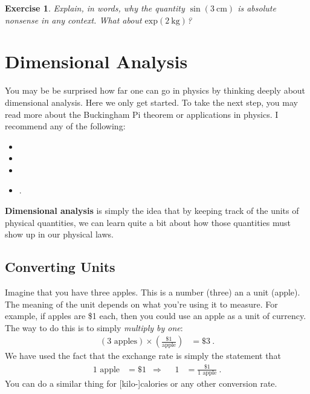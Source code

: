 \documentclass[
  11pt,
	colorful,
	raggedright,
]{tufte-style-thesis-flip}
\newtheorem{exercise}{Exercise}[section]
\begin{document}
\begin{exercise}
Explain, in words, why the quantity $\sin(3~\text{cm})$ is absolute nonsense in any context. What about $\text{exp}(2~\text{kg})$?
\end{exercise}

\chapter{Dimensional Analysis}

You may be be surprised how far one can go in physics by thinking deeply about dimensional analysis. Here we only get started. To take the next step, you may read more about the Buckingham Pi theorem or applications in physics. I recommend any of the following:
\begin{itemize}
  \item {}
  \item {}
  \item {}
  \item {}.
\end{itemize}
\textbf{Dimensional analysis} is simply the idea that by keeping track of the units of physical quantities, we can learn quite a bit about how those quantities must show up in our physical laws.


\section{Converting Units}

Imagine that you have three apples. This is a number (three) an a unit (apple). The meaning of the unit depends on what you're using it to measure. For example, if apples are \$1 each, then you could use an apple as a unit of currency. The way to do this is to simply \emph{multiply by one}:
\begin{align}
  (3\text{ apples}) \times \left(\frac{\text{\$ 1}}{\text{apple}}\right)
  &= \$ 3 \ .
\end{align}
We have used the fact that the exchange rate is simply the statement that
\begin{align}
  1\text{ apple} &= \$1
  & \Rightarrow &&
  1 &= \frac{\$ 1}{1\text{ apple}} \ .
\end{align}
You can do a similar thing for [kilo-]calories or any other conversion rate. 
\end{document}
